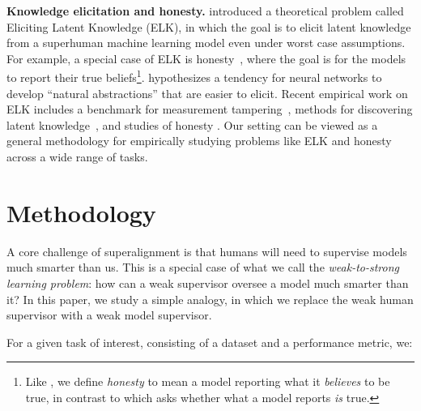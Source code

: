 \textbf{Knowledge elicitation and honesty.}\quad
\citet{christiano2022eliciting} introduced a theoretical problem called Eliciting Latent Knowledge (ELK), in which the goal is to elicit latent knowledge from a superhuman machine learning model even under worst case assumptions.  For example, a special case of ELK is honesty~\citep{evans2021truthful}, where the goal is for the models to report their true beliefs\footnote{Like \cite{evans2021truthful}, we define \textit{honesty} to mean a model reporting what it \textit{believes} to be true, in contrast to  which asks whether what a model reports \textit{is} true.}.
\citet{wentworth2020alignment} hypothesizes a tendency for neural networks to develop ``natural abstractions'' that are easier to elicit. Recent empirical work on ELK includes a benchmark for measurement tampering~\citep{roger2023measurement}, methods for discovering latent knowledge~\citep{burns2023discovering}, and studies of honesty
\citep{li2023inference, pacchiardi2023catch}. Our setting can be viewed as a general methodology for empirically studying problems like ELK and honesty across a wide range of tasks. 

\section{Methodology}
\label{sec:methodology}

A core challenge of superalignment is that humans will need to supervise models much smarter than us. This is a special case of what we call the \textit{weak-to-strong learning problem}: how can a weak supervisor oversee a model much smarter than it? In this paper, we study a simple analogy, in which we replace the weak human supervisor with a weak model supervisor.

For a given task of interest, consisting of a dataset and a performance metric, we:


